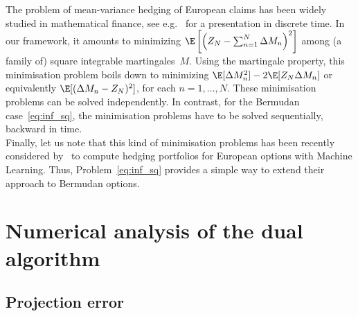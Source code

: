 \begin{remark}\label{Rk_Europ}
The problem of mean-variance hedging of European claims has been widely studied in mathematical finance, see e.g.~\cite{Schweizer} for a presentation in discrete time. In our framework, it amounts to minimizing $\E\left[\left(Z_N-\sum_{n=1}^N \Delta M_n\right)^2\right]$ among (a family of) square integrable martingales~$M$. Using the martingale property, this minimisation problem boils down to minimizing $\E[\Delta M_n^2]-2\E[Z_N\Delta M_n]$ or equivalently $\E[(\Delta M_n-Z_N)^2]$, for each $n=1,\dots,N$. These minimisation problems can  be solved independently. In contrast, for the Bermudan case~\eqref{eq:inf_sq}, the minimisation problems have to be solved sequentially, backward in time. \\
Finally, let us note that this kind of minimisation problems has been recently considered by~\cite{BGTBW} to compute hedging portfolios for European options with Machine Learning. 
Thus, Problem~\eqref{eq:inf_sq} provides a simple way to extend their approach to Bermudan options. 
\end{remark}



\section{Numerical analysis of the dual algorithm}\label{Sec_NumericalAnalysis}

\subsection{Projection error}


